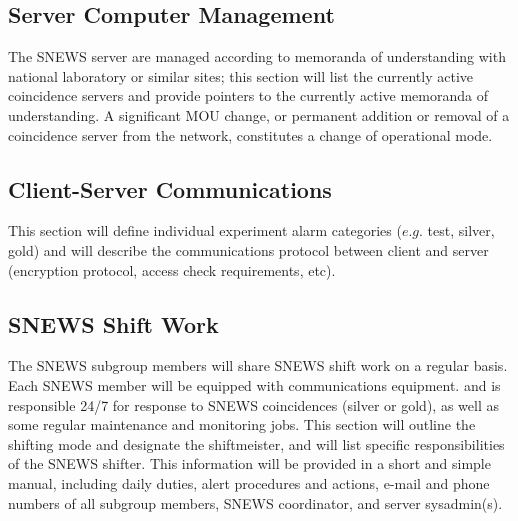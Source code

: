 \documentclass{article}
\begin{document}
\subsection{Server Computer Management}

The SNEWS server are managed according to memoranda
of understanding with national laboratory or similar sites;
this section will list the currently active coincidence
servers and provide pointers to the currently active memoranda
of understanding.  A significant MOU change, or permanent addition
or removal of a coincidence server from the network,  
constitutes a change of operational mode.


\subsection{Client-Server Communications}

This section will define individual experiment alarm categories 
($e.g.$ test, silver, gold) and will describe the 
communications protocol between client and server (encryption
protocol, access check requirements, etc).

\subsection{SNEWS Shift Work}

The SNEWS subgroup members will share SNEWS shift work on a regular
basis.  Each SNEWS member will be equipped with communications
equipment.  and is responsible 24/7 for response to SNEWS coincidences
(silver or gold), as well as some regular maintenance and monitoring
jobs.  This section will outline the shifting mode and designate the
shiftmeister, and will list specific responsibilities of the SNEWS
shifter.  This information will be provided in a short and simple
manual, including daily duties, alert procedures and actions, e-mail
and phone numbers of all subgroup members, SNEWS coordinator, and
server sysadmin(s).
\end{document}
